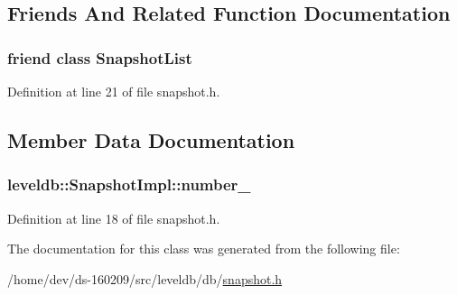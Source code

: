 \subsection{Friends And Related Function Documentation}
\hypertarget{classleveldb_1_1_snapshot_impl_abe14b2fb5e32159324c619e1a42327a0}{}
\subsubsection[{Snapshot\+List}]{\setlength{\rightskip}{0pt plus 5cm}friend class {\bf Snapshot\+List}\hspace{0.3cm}{\ttfamily [friend]}}\label{classleveldb_1_1_snapshot_impl_abe14b2fb5e32159324c619e1a42327a0}


Definition at line 21 of file snapshot.\+h.



\subsection{Member Data Documentation}
\hypertarget{classleveldb_1_1_snapshot_impl_aa31dca969679d05d17c4c0eb1443a96e}{}
\subsubsection[{number\+\_\+}]{ leveldb\+::\+Snapshot\+Impl\+::number\+\_\+}\label{classleveldb_1_1_snapshot_impl_aa31dca969679d05d17c4c0eb1443a96e}


Definition at line 18 of file snapshot.\+h.



The documentation for this class was generated from the following file\+:\begin{DoxyCompactItemize}
\item 
/home/dev/ds-\/160209/src/leveldb/db/\hyperlink{snapshot_8h}{snapshot.\+h}\end{DoxyCompactItemize}
